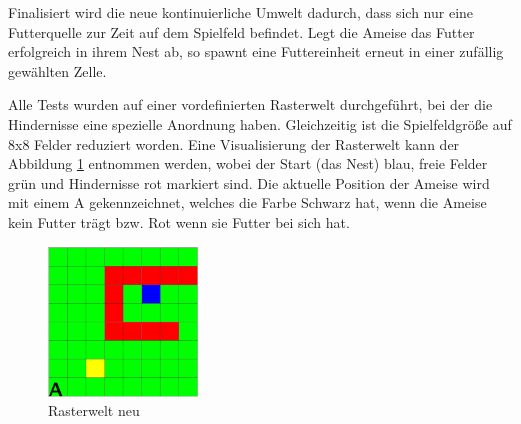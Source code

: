 \par 
Finalisiert wird die neue kontinuierliche Umwelt dadurch, dass sich nur eine Futterquelle zur Zeit auf dem Spielfeld befindet. Legt die Ameise das Futter erfolgreich in ihrem Nest ab, so spawnt eine Futtereinheit erneut in einer zufällig gewählten Zelle.
\par 
Alle Tests wurden auf einer vordefinierten Rasterwelt durchgeführt, bei der die Hindernisse eine spezielle Anordnung haben. Gleichzeitig ist die Spielfeldgröße auf 8x8 Felder reduziert worden. Eine Visualisierung der Rasterwelt  kann der Abbildung \ref{fig:rasterweltNeu} entnommen werden, wobei der Start (das Nest) blau, freie Felder grün und Hindernisse rot markiert sind. Die aktuelle Position der Ameise wird mit einem \glqq A\grqq{} gekennzeichnet, welches die Farbe Schwarz hat, wenn die Ameise kein Futter trägt bzw. Rot wenn sie Futter bei sich hat.
\begin{figure}[H]
    \begin{center}
    \includegraphics[width=150px]{images/rasterwelt_neu.png}  \end{center}
    \caption{Rasterwelt neu}
    \label{fig:rasterweltNeu}
  \end{figure}

